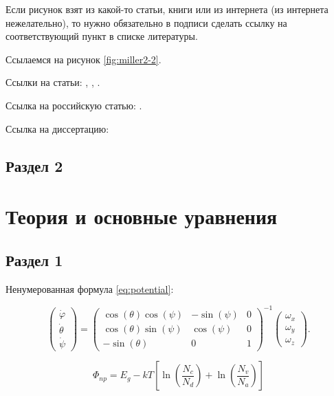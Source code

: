 \documentclass[a4paper,14pt]{extarticle}
\begin{document}
    Если рисунок взят из какой-то статьи, книги или из интернета (из интернета нежелательно), то нужно обязательно в подписи сделать ссылку на соответствующий пункт в списке литературы.

    Ссылаемся на рисунок \ref{fig:miller2-2}.
    
    Ссылки на статьи: \cite{miller1}, \cite{miller2}, \cite{mohseni1}.

    Ссылка на российскую статью: \cite{skubachevskii1}.

    Ссылка на диссертацию:  \cite{pavlichenko1}

\subsection{Раздел 2}

\pagebreak
\section{Теория и основные уравнения}

\subsection{Раздел 1}

Ненумерованная формула \ref{eq:potential}:

\begin{equation}
    \begin{pmatrix} \dot{\varphi}\\ \dot{\theta} \\ \dot{\psi} \end{pmatrix}
    = \begin{pmatrix}
        \cos(\theta)\cos(\psi) & -\sin(\psi) & 0 \\
        \cos(\theta)\sin(\psi) & \cos(\psi)  & 0 \\
        -\sin(\theta)         & 0         &  1
    \end{pmatrix}^{-1}
    \begin{pmatrix} \omega_x\\ \omega_y \\ \omega_z \end{pmatrix}. \nonumber
\end{equation}

\begin{equation}
    \label{eq:potential}
    \Phi_{np}=E_{g}-kT\left[\ln\left(\frac{N_{c}}{N_{d}}\right)+\ln\left(\frac{N_{v}}{N_{a}}\right)\right]
\end{equation}
\end{document}
